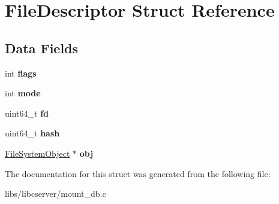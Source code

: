 \hypertarget{structFileDescriptor}{}\section{File\+Descriptor Struct Reference}
\label{structFileDescriptor}
\subsection*{Data Fields}
\begin{DoxyCompactItemize}
\item 
int {\bfseries flags}\hypertarget{structFileDescriptor_aef1bee11d43adf16bd92780e888cbb12}{}\label{structFileDescriptor_aef1bee11d43adf16bd92780e888cbb12}

\item 
int {\bfseries mode}\hypertarget{structFileDescriptor_a08d2a22e9af988fd31ecde7acc2abf42}{}\label{structFileDescriptor_a08d2a22e9af988fd31ecde7acc2abf42}

\item 
uint64\+\_\+t {\bfseries fd}\hypertarget{structFileDescriptor_ae3126f01c1f18403141b5a7500ced5c3}{}\label{structFileDescriptor_ae3126f01c1f18403141b5a7500ced5c3}

\item 
uint64\+\_\+t {\bfseries hash}\hypertarget{structFileDescriptor_a3d21849a24ad2e1b62dc26ea361c7701}{}\label{structFileDescriptor_a3d21849a24ad2e1b62dc26ea361c7701}

\item 
\hyperlink{structFileSystemObject}{File\+System\+Object} $\ast$ {\bfseries obj}\hypertarget{structFileDescriptor_a62d1abcf77823df1d1e4fadb0839f86b}{}\label{structFileDescriptor_a62d1abcf77823df1d1e4fadb0839f86b}

\end{DoxyCompactItemize}


The documentation for this struct was generated from the following file\+:\begin{DoxyCompactItemize}
\item 
libs/libcserver/mount\+\_\+db.\+c\end{DoxyCompactItemize}
